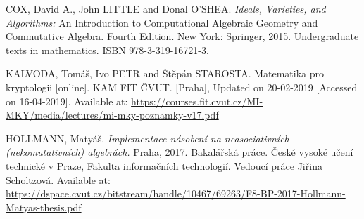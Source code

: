 \begin{thebibliography}{10}


 {COX, David A., John LITTLE and Donal O'SHEA. \textit{Ideals, Varieties, and Algorithms:} An Introduction to Computational Algebraic Geometry and Commutative Algebra. Fourth Edition. New York: Springer, 2015. Undergraduate texts in mathematics. ISBN 978-3-319-16721-3.}

 {KALVODA, Tomáš, Ivo PETR and Štěpán STAROSTA. Matematika pro kryptologii [online]. KAM FIT ČVUT. [Praha], Updated on 20-02-2019 [Accessed on 16-04-2019]. Available at: \url{https://courses.fit.cvut.cz/MI-MKY/media/lectures/mi-mky-poznamky-v17.pdf}}

 {HOLLMANN, Matyáš. \textit{Implementace násobení na neasociativních (nekomutativních) algebrách.} Praha, 2017. Bakalářská práce. České vysoké učení technické v Praze, Fakulta informačních technologií. Vedoucí práce Jiřina Scholtzová. Available at: \url{https://dspace.cvut.cz/bitstream/handle/10467/69263/F8-BP-2017-Hollmann-Matyas-thesis.pdf}}



\end{thebibliography}